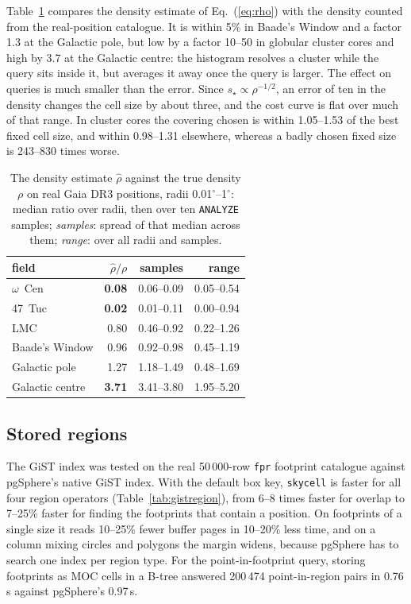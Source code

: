 \documentclass[final,5p,times,twocolumn,authoryear]{elsarticle}
\newcommand{\degr}{\ensuremath{^{\circ}}}
\begin{document}
Table~\ref{tab:estimator} compares the density estimate of Eq.~(\ref{eq:rho}) with the
density counted from the real-position catalogue. It is within 5\% in Baade's Window and a
factor 1.3 at the Galactic pole, but low by a factor 10--50 in globular cluster cores and
high by 3.7 at the Galactic centre: the histogram resolves a cluster while the query
sits inside it, but averages it away once the query is larger. The effect on queries is
much smaller than the error. Since $s_\star\propto\rho^{-1/2}$, an error of ten in the
density changes the cell size by about three, and the cost curve is flat over much of
that range. In cluster cores the covering chosen is within 1.05--1.53 of the best fixed
cell size, and within 0.98--1.31 elsewhere, whereas a badly chosen fixed size is
243--830 times worse.

\begin{table}
  \caption{The density estimate $\hat\rho$ against the true density $\rho$ on real Gaia
    DR3 positions, radii 0.01\degr--1\degr: median ratio over radii, then over ten
    \texttt{ANALYZE} samples; \emph{samples}: spread of that median across them;
    \emph{range}: over all radii and samples.}
  \label{tab:estimator}
  \centering
  \footnotesize
  \begin{tabular}{l rrr}
    \hline\hline
    field & $\hat\rho/\rho$ & samples & range \\
    \hline
    $\omega$~Cen           & \textbf{0.08} & 0.06--0.09 & 0.05--0.54 \\
    47~Tuc                 & \textbf{0.02} & 0.01--0.11 & 0.00--0.94 \\
    LMC                    & 0.80 & 0.46--0.92 & 0.22--1.26 \\
    Baade's Window         & 0.96 & 0.92--0.98 & 0.45--1.19 \\
    Galactic pole          & 1.27 & 1.18--1.49 & 0.48--1.69 \\
    Galactic centre        & \textbf{3.71} & 3.41--3.80 & 1.95--5.20 \\
    \hline
  \end{tabular}
\end{table}

\subsection{Stored regions}
\label{sec:tests-regions}

The GiST index was tested on the real 50\,000-row \texttt{fpr} footprint catalogue
against pgSphere's native GiST index. With the default box key, \texttt{skycell} is
faster for all four region operators (Table~\ref{tab:gistregion}), from 6--8 times
faster for overlap to 7--25\% faster for finding the footprints that contain a
position. On footprints of a single size it reads 10--25\% fewer buffer pages in
10--20\% less time, and on a column mixing circles and polygons the margin widens,
because pgSphere has to search one index per region type. For the point-in-footprint
query, storing footprints as MOC cells in a B-tree answered 200\,474 point-in-region
pairs in 0.76\,s against pgSphere's 0.97\,s.
\end{document}

